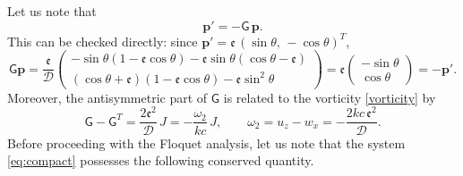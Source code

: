\documentclass[reqno]{amsart}
\newcommand{\Msf}{\mathsf{G}}
\newcommand{\D}{\mathcal{D}}
\newcommand{\ee}{\mathfrak{e}}
\begin{document}
Let us note that
\begin{equation}\label{eq:ptransport}
\mathbf p'=-\Msf\,\mathbf p.
\end{equation}
This can be checked directly: since $\mathbf p'=\ee\,(\sin\theta,\,-\cos\theta)^T$,
\begin{equation}
\Msf\mathbf p=\frac{\ee}{\D}\begin{pmatrix}-\sin\theta(1-\ee\cos\theta)-\ee\sin\theta(\cos\theta-\ee)\\ (\cos\theta+\ee)(1-\ee\cos\theta)-\ee\sin^2\theta\end{pmatrix}
=\ee\begin{pmatrix}-\sin\theta\\ \cos\theta\end{pmatrix}=-\mathbf p'.
\end{equation}
Moreover, the antisymmetric part of $\Msf$ is related to the vorticity \eqref{vorticity} by
\begin{equation}\label{eq:antisym}
\Msf-\Msf^T=\frac{2\ee^2}{\D}\,J=-\frac{\omega_2}{kc}\,J,\qquad \omega_2=u_z-w_x=-\frac{2kc\,\ee^{2}}{\D}.
\end{equation}
Before proceeding with the Floquet analysis, let us note that the system \eqref{eq:compact} possesses the following conserved quantity.
\end{document}
